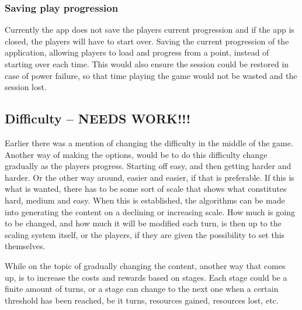 \subsubsection{Saving play progression}
Currently the app does not save the players current progression and if the app is closed, the players will have to start over. Saving the current progression of the application, allowing players to load and progress from a point, instead of starting over each time. This would also ensure the session could be restored in case of power failure, so that time playing the game would not be wasted and the session lost.

\subsection{Difficulty -- NEEDS WORK!!!}
Earlier there was a mention of changing the difficulty in the middle of the game. Another way of making the options, would be to do this difficulty change gradually as the players progress. Starting off easy, and then getting harder and harder. Or the other way around, easier and easier, if that is preferable. If this is what is wanted, there has to be some sort of scale that shows what constitutes hard, medium and easy. When this is established, the algorithms can be made into generating the content on a declining or increasing scale. How much is going to be changed, and how much it will be modified each turn, is then up to the scaling system itself, or the players, if they are given the possibility to set this themselves.

While on the topic of gradually changing the content, another way that comes up, is to increase the costs and rewards based on stages.
Each stage could be a finite amount of turns, or a stage can change to the next one when a certain threshold has been reached, be it turns, resources gained, resources lost, etc.

